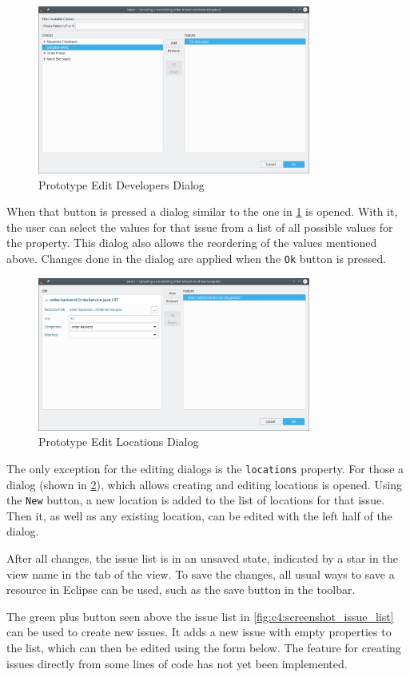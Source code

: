 \begin{figure}[!h]
	\centering
	\includegraphics[width=0.8\textwidth]{graphics/screenshot_gropius_ei_edit_list.png}
	\caption{Prototype Edit Developers Dialog}
	\label{fig:c4:screenshot_edit_list}
\end{figure}

When that button is pressed a dialog similar to the one in \cref{fig:c4:screenshot_edit_list} is opened.
With it, the user can select the values for that issue from a list of all possible values for the property.
This dialog also allows the reordering of the values mentioned above.
Changes done in the dialog are applied when the \lstinline|Ok| button is pressed.

\begin{figure}[!h]
	\centering
	\includegraphics[width=0.8\textwidth]{graphics/screenshot_gropius_ei_edit_locations.png}
	\caption{Prototype Edit Locations Dialog}
	\label{fig:c4:screenshot_edit_locations}
\end{figure}

The only exception for the editing dialogs is the \lstinline|locations| property.
For those a dialog (shown in \cref{fig:c4:screenshot_edit_locations}), which allows creating and editing locations is opened.
Using the \lstinline|New| button, a new location is added to the list of locations for that issue.
Then it, as well as any existing location, can be edited with the left half of the dialog.

After all changes, the issue list is in an unsaved state, indicated by a star in the view name in the tab of the view.
To save the changes, all usual ways to save a resource in \gls{Eclipse} can be used, such as the save button in the toolbar.

The green plus button seen above the issue list in \cref{fig:c4:screenshot_issue_list} can be used to create new issues.
It adds a new issue with empty properties to the list, which can then be edited using the form below.
The feature for creating issues directly from some lines of code has not yet been implemented.
